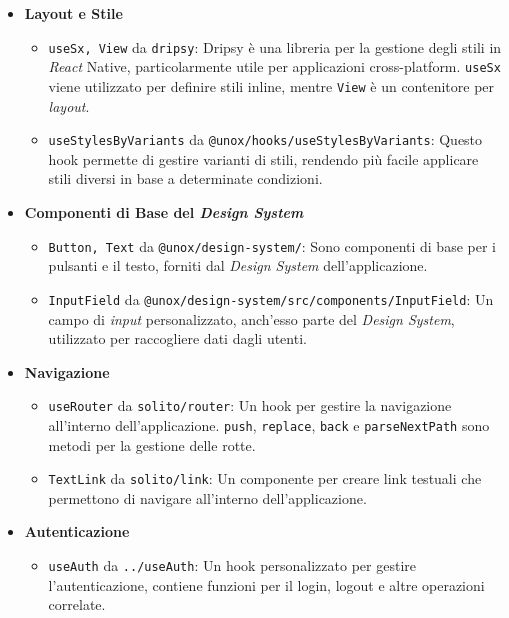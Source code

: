 \begin{itemize}
    \item \textbf{Layout e Stile}
    \begin{itemize}
        \item \texttt{useSx, View} da \texttt{dripsy}: Dripsy è una libreria per la gestione degli stili in \textit{React} Native, particolarmente utile per applicazioni cross-platform. \texttt{useSx} viene utilizzato per definire stili inline, mentre \texttt{View} è un contenitore per \textit{layout}.
        \item \texttt{useStylesByVariants} da \texttt{@unox/hooks/useStylesByVariants}: Questo hook permette di gestire varianti di stili, rendendo più facile applicare stili diversi in base a determinate condizioni.
    \end{itemize}
    
    \item \textbf{Componenti di Base del \textit{Design System}}
    \begin{itemize}
        \item \texttt{Button, Text} da \texttt{@unox/design-system/}: Sono componenti di base per i pulsanti e il testo, forniti dal \textit{Design System} dell'applicazione.
        \item \texttt{InputField} da \texttt{@unox/design-system/src/components/InputField}: Un campo di \textit{input} personalizzato, anch'esso parte del \textit{Design System}, utilizzato per raccogliere dati dagli utenti.
    \end{itemize}
    
    \item \textbf{Navigazione}
    \begin{itemize}
        \item \texttt{useRouter} da \texttt{solito/router}: Un hook per gestire la navigazione all'interno dell'applicazione. \texttt{push}, \texttt{replace}, \texttt{back} e \texttt{parseNextPath} sono metodi per la gestione delle rotte.
        \item \texttt{TextLink} da \texttt{solito/link}: Un componente per creare link testuali che permettono di navigare all'interno dell'applicazione.
    \end{itemize}
    
    \item \textbf{Autenticazione}
    \begin{itemize}
        \item \texttt{useAuth} da \texttt{../useAuth}: Un hook personalizzato per gestire l'autenticazione, contiene funzioni per il login, logout e altre operazioni correlate.
    \end{itemize}
    

\end{itemize}
